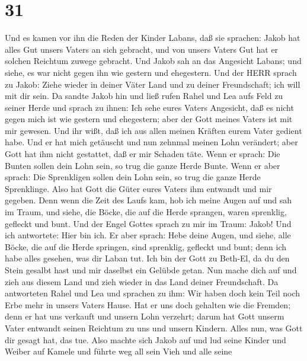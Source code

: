 \hypertarget{section-30}{%
\section{31}\label{section-30}}

 Und es kamen vor ihn die Reden der Kinder Labans, daß sie
sprachen: Jakob hat alles Gut unsers Vaters an sich gebracht, und von
unsers Vaters Gut hat er solchen Reichtum zuwege gebracht. 
Und Jakob sah an das Angesicht Labans; und siehe, es war nicht gegen ihn
wie gestern und ehegestern.  Und der HERR sprach zu Jakob:
Ziehe wieder in deiner Väter Land und zu deiner Freundschaft; ich will
mit dir sein.  Da sandte Jakob hin und ließ rufen Rahel und
Lea aufs Feld zu seiner Herde  und sprach zu ihnen: Ich sehe
eures Vaters Angesicht, daß es nicht gegen mich ist wie gestern und
ehegestern; aber der Gott meines Vaters ist mit mir gewesen.
 Und ihr wißt, daß ich aus allen meinen Kräften eurem Vater
gedient habe.  Und er hat mich getäuscht und nun zehnmal
meinen Lohn verändert; aber Gott hat ihm nicht gestattet, daß er mir
Schaden täte.  Wenn er sprach: Die Bunten sollen dein Lohn
sein, so trug die ganze Herde Bunte. Wenn er aber sprach: Die
Sprenkligen sollen dein Lohn sein, so trug die ganze Herde Sprenklinge.
 Also hat Gott die Güter eures Vaters ihm entwandt und mir
gegeben.  Denn wenn die Zeit des Laufs kam, hob ich meine
Augen auf und sah im Traum, und siehe, die Böcke, die auf die Herde
sprangen, waren sprenklig, gefleckt und bunt.  Und der
Engel Gottes sprach zu mir im Traum: Jakob! Und ich antwortete: Hier bin
ich.  Er aber sprach: Hebe deine Augen, und siehe, alle
Böcke, die auf die Herde springen, sind sprenklig, gefleckt und bunt;
denn ich habe alles gesehen, was dir Laban tut.  Ich bin
der Gott zu Beth-El, da du den Stein gesalbt hast und mir daselbst ein
Gelübde getan. Nun mache dich auf und zieh aus diesem Land und zieh
wieder in das Land deiner Freundschaft.  Da antworteten
Rahel und Lea und sprachen zu ihm: Wir haben doch kein Teil noch Erbe
mehr in unsers Vaters Hause.  Hat er uns doch gehalten wie
die Fremden; denn er hat uns verkauft und unsern Lohn verzehrt;
 darum hat Gott unserm Vater entwandt seinen Reichtum zu
uns und unsern Kindern. Alles nun, was Gott dir gesagt hat, das tue.
 Also machte sich Jakob auf und lud seine Kinder und Weiber
auf Kamele  und führte weg all sein Vieh und alle seine
